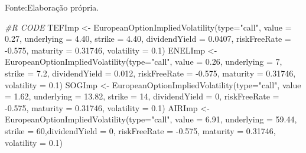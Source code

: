 \documentclass[
  12pt,
  a4paper,
  openany]{book}
\newenvironment{Shaded}{\begin{snugshade}}{\end{snugshade}}
\newcommand{\AttributeTok}[1]{\textcolor[rgb]{0.77,0.63,0.00}{#1}}
\newcommand{\CommentTok}[1]{\textcolor[rgb]{0.56,0.35,0.01}{\textit{#1}}}
\newcommand{\DecValTok}[1]{\textcolor[rgb]{0.00,0.00,0.81}{#1}}
\newcommand{\FloatTok}[1]{\textcolor[rgb]{0.00,0.00,0.81}{#1}}
\newcommand{\FunctionTok}[1]{\textcolor[rgb]{0.00,0.00,0.00}{#1}}
\newcommand{\NormalTok}[1]{#1}
\newcommand{\OtherTok}[1]{\textcolor[rgb]{0.56,0.35,0.01}{#1}}
\newcommand{\SpecialCharTok}[1]{\textcolor[rgb]{0.00,0.00,0.00}{#1}}
\newcommand{\StringTok}[1]{\textcolor[rgb]{0.31,0.60,0.02}{#1}}
\theoremstyle{definition}
\theoremstyle{definition}
\theoremstyle{definition}
\theoremstyle{remark}
\begin{document}
Fonte:Elaboração própria.

\justifying
\bigskip

\scriptsize

\begin{Shaded}
\begin{Highlighting}[]
\CommentTok{\#R CODE}
\NormalTok{TEFImp }\OtherTok{\textless{}{-}} \FunctionTok{EuropeanOptionImpliedVolatility}\NormalTok{(}\AttributeTok{type=}\StringTok{"call"}\NormalTok{, }\AttributeTok{value =} \FloatTok{0.27}\NormalTok{, }\AttributeTok{underlying =} \FloatTok{4.40}\NormalTok{, }\AttributeTok{strike =} \FloatTok{4.40}\NormalTok{,}
                                          \AttributeTok{dividendYield =} \FloatTok{0.0407}\NormalTok{, }\AttributeTok{riskFreeRate =} \SpecialCharTok{{-}}\FloatTok{0.575}\NormalTok{, }
                                          \AttributeTok{maturity =} \FloatTok{0.31746}\NormalTok{, }\AttributeTok{volatility =} \FloatTok{0.1}\NormalTok{)}
\NormalTok{ENELImp }\OtherTok{\textless{}{-}} \FunctionTok{EuropeanOptionImpliedVolatility}\NormalTok{(}\AttributeTok{type=}\StringTok{"call"}\NormalTok{, }\AttributeTok{value =} \FloatTok{0.26}\NormalTok{, }\AttributeTok{underlying =} \DecValTok{7}\NormalTok{, }\AttributeTok{strike =} \FloatTok{7.2}\NormalTok{,}
                                           \AttributeTok{dividendYield =} \FloatTok{0.012}\NormalTok{, }\AttributeTok{riskFreeRate =} \SpecialCharTok{{-}}\FloatTok{0.575}\NormalTok{,}
                                           \AttributeTok{maturity =} \FloatTok{0.31746}\NormalTok{, }\AttributeTok{volatility =} \FloatTok{0.1}\NormalTok{)}
\NormalTok{SOGImp }\OtherTok{\textless{}{-}} \FunctionTok{EuropeanOptionImpliedVolatility}\NormalTok{(}\AttributeTok{type=}\StringTok{"call"}\NormalTok{, }\AttributeTok{value =} \FloatTok{1.62}\NormalTok{, }\AttributeTok{underlying =} \FloatTok{13.82}\NormalTok{, }\AttributeTok{strike =} \DecValTok{14}\NormalTok{,}
                                          \AttributeTok{dividendYield =} \DecValTok{0}\NormalTok{, }\AttributeTok{riskFreeRate =} \SpecialCharTok{{-}}\FloatTok{0.575}\NormalTok{, }\AttributeTok{maturity =} \FloatTok{0.31746}\NormalTok{, }
                                          \AttributeTok{volatility =} \FloatTok{0.1}\NormalTok{)}
\NormalTok{AIRImp }\OtherTok{\textless{}{-}} \FunctionTok{EuropeanOptionImpliedVolatility}\NormalTok{(}\AttributeTok{type=}\StringTok{"call"}\NormalTok{, }\AttributeTok{value =} \FloatTok{6.91}\NormalTok{, }\AttributeTok{underlying =} \FloatTok{59.44}\NormalTok{, }
                                          \AttributeTok{strike =} \DecValTok{60}\NormalTok{,}\AttributeTok{dividendYield =} \DecValTok{0}\NormalTok{, }\AttributeTok{riskFreeRate =} \SpecialCharTok{{-}}\FloatTok{0.575}\NormalTok{, }
                                          \AttributeTok{maturity =} \FloatTok{0.31746}\NormalTok{, }\AttributeTok{volatility =} \FloatTok{0.1}\NormalTok{)}
\end{Highlighting}
\end{Shaded}
\end{document}
